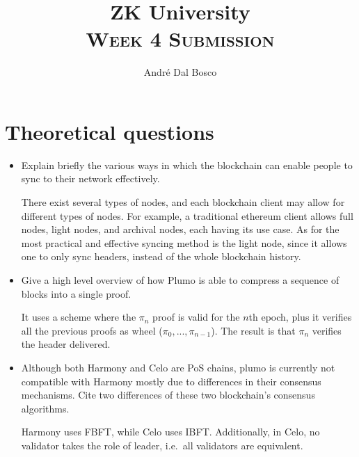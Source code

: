 \documentclass{article}
\title{ZK University \\[4pt] \normalsize\textsc{Week 4 Submission}}
\author{André Dal Bosco \\ \small{\email \quad \discord}}
\begin{document}
\maketitle

\section*{Theoretical questions}
\begin{itemize}
    \item Explain briefly the various ways in which the blockchain can enable people to sync to their network effectively. \par There exist several types of nodes, and each blockchain client may allow for different types of nodes. For example, a traditional ethereum client allows full nodes, light nodes, and archival nodes, each having its use case. As for the most practical and effective syncing method is the light node, since it allows one to only sync headers, instead of the whole blockchain history.
    \item Give a high level overview of how Plumo is able to compress a sequence of blocks into a single proof. \par It uses a scheme where the $\pi_n$ proof is valid for the $n$th epoch, plus it verifies all the previous proofs as wheel ($\pi_0, ..., \pi_{n-1}$). The result is that $\pi_n$ verifies the header delivered.
    \item Although both Harmony and Celo are PoS chains, plumo is currently not compatible with Harmony mostly due to differences in their consensus mechanisms. Cite two differences of these two blockchain's consensus algorithms. \par Harmony uses FBFT, while Celo uses IBFT. Additionally, in Celo, no validator takes the role of leader, i.e.\ all validators are equivalent.
\end{itemize}
\end{document}
